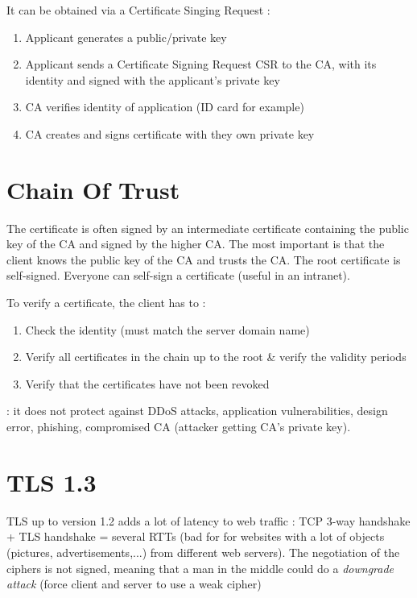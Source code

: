 It can be obtained via a Certificate Singing Request :
\begin{enumerate}
    \item Applicant generates a public/private key
    \item Applicant sends a Certificate Signing Request CSR to the CA, with its identity and signed with the applicant's private key
    \item CA verifies identity of application (ID card for example)
    \item CA creates and signs certificate with they own private key
\end{enumerate}

\section{Chain Of Trust}

The certificate is often signed by an intermediate certificate containing the public key of the CA and signed by the higher CA. The most important is that the client knows the public key of the CA and trusts the CA. The root certificate is self-signed. Everyone can self-sign a certificate (useful in an intranet).

To verify a certificate, the client has to :
\begin{enumerate}
    \item Check the identity (must match the server domain name)
    \item Verify all certificates in the chain up to the root \& verify the validity periods
    \item Verify that the certificates have not been revoked
\end{enumerate}

 : it does not protect against DDoS attacks, application vulnerabilities, design error, phishing, compromised CA (attacker getting CA's private key).

\section{TLS 1.3}

TLS up to version 1.2 adds a lot of latency to web traffic : TCP 3-way handshake + TLS handshake = several RTTs (bad for for websites with a lot of objects (pictures, advertisements,...) from different web servers). The negotiation of the ciphers is not signed, meaning that a man in the middle could do a \textit{downgrade attack} (force client and server to use a weak cipher)

